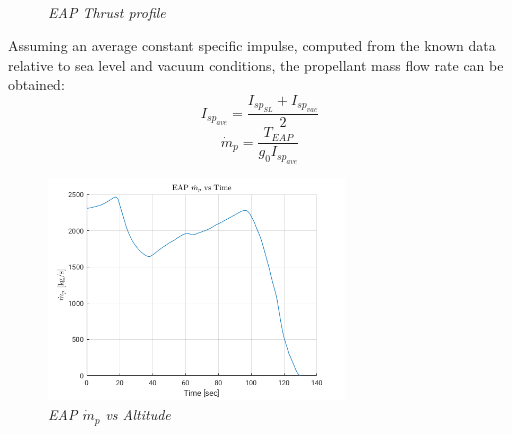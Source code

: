 \documentclass[12pt,fleqn,openany]{book} %
\begin{document}
\begin{figure}[h]
\centering
{} \quad
{} \\
\caption{\emph{EAP Thrust profile}}
\label{fig:interp}
\end{figure}
Assuming an average constant specific impulse, computed from the known data relative to sea level and vacuum conditions, the propellant mass flow rate can be obtained:
\begin{equation}
 I_{sp_{ave}}=\frac{I_{sp_{SL}}+I_{sp_{vac}}}{2}
\end{equation}
\begin{equation}
 \dot{m}_p = \frac{T_{EAP}}{g_0I_{sp_{ave}}}
\end{equation}
\begin{figure}[h]
 \centering
 \includegraphics[width=0.7\textwidth]{EAP_mdot}
 \caption{\emph{EAP $\dot{m}_p$ vs Altitude}}
\end{figure}
\end{document}
